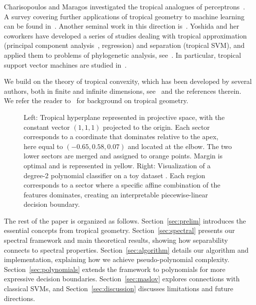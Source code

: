 \documentclass{article}
\begin{document}
Charisopoulos and Maragos investigated the tropical analogues
of perceptrons~\cite{Charisopoulos2017}.
A survey covering further applications of tropical geometry to machine learning
can be found in~\cite{maragos2021}. Another seminal work in this direction is~\cite{zhang2018}.
Yoshida and her coworkers have developed a series of studies
dealing with tropical approximation (principal component analysis~\cite{yoshida2019},
regression)
and separation (tropical SVM), and applied them to problems of phylogenetic analysis,
see~\cite{monod2022}. In particular, tropical support vector machines are studied
in~\cite{tang2020,Yoshida2023}.

We build on the theory of tropical convexity,
which has been developed by several authors,
both in finite and infinite dimensions, see~\cite{Litvinov2001,develin2004,cohen2004} and the references therein.
We refer the reader to~\cite{maclagan2015} for background
on tropical geometry.


\begin{figure}[h]
    \centering
    \begin{subfigure}[b]{0.35\textwidth}
        \centering
        \resizebox{\textwidth}{!}{\clipbox{0.1\width{} 0.1\height{} 0.1\width{} 0.1\height{}}{}}
    \end{subfigure}
    \hfill
    \begin{subfigure}[b]{0.61\textwidth}
        \centering
        \resizebox{\textwidth}{!}{\clipbox{0.15\width{} 0.30\height{} 0.15\width{} 0.30\height{}}{}}
    \end{subfigure}
    \caption{Left: Tropical hyperplane represented in projective space, with the constant vector $(1, 1, 1)$ projected to the origin. Each sector corresponds to a coordinate that dominates relative to the apex, here equal to $(-0.65, 0.58, 0.07)$ and located at the elbow. The two lower sectors are merged and assigned to orange points. Margin is optimal and is represented in yellow. Right: Visualization of a degree-2 polynomial classifier on a toy dataset \cite{scikit-learn}. Each region corresponds to a sector where a specific affine combination of the features dominates, creating an interpretable piecewise-linear decision boundary.}
    \label{fig:tropical_poly}
\end{figure}
The rest of the paper is organized as follows. Section~\ref{sec:prelim} introduces the essential concepts from tropical geometry. Section~\ref{sec:spectral} presents our spectral framework and main theoretical results, showing how separability connects to spectral properties. Section~\ref{sec:algorithm} details our algorithm and implementation, explaining how we achieve pseudo-polynomial complexity. Section~\ref{sec:polynomials} extends the framework to polynomials for more expressive decision boundaries. Section~\ref{sec:maslov} explores connections with classical SVMs, and Section~\ref{sec:discussion} discusses limitations and future directions.
\end{document}
